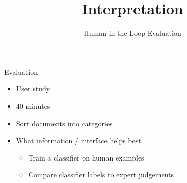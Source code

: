 \documentclass[compress]{beamer}
\title{Interpretation}
\date{Human in the Loop Evaluation}
\begin{document}
\frame{\titlepage
}



\begin{frame}{Evaluation}

  \begin{itemize}
    \item User study
    \item 40 minutes
    \item Sort documents into categories
    \item What information / interface \alert<2>{helps best}
      \pause
      \pause
      \begin{itemize}
        \item Train a classifier on human examples
        \item Compare classifier labels to expert judgements
      \end{itemize}
  \end{itemize}

\end{frame}
\end{document}
